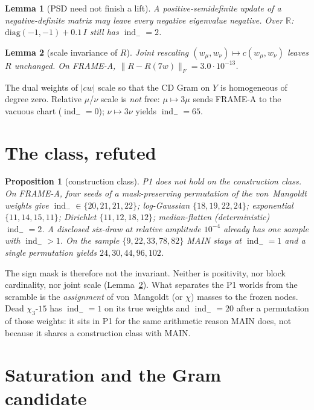 \documentclass[11pt]{article}
\newtheorem{lemma}{Lemma}
\newtheorem{prop}{Proposition}
\theoremstyle{remark}
\newcommand{\indm}{\operatorname{ind}_{-}}
\begin{document}
\begin{lemma}[PSD need not finish a lift]\label{lem:psd}
A positive-semidefinite update of a negative-definite matrix
may leave every negative eigenvalue negative.
Over $\mathbb{R}$: $\mathrm{diag}(-1,-1)+0.1\,I$ still has
$\indm=2$.
\end{lemma}

\begin{lemma}[scale invariance of $R$]\label{lem:scale}
Joint rescaling $(w_\mu,w_\nu)\mapsto c(w_\mu,w_\nu)$ leaves
$R$ unchanged.
On FRAME-A, $\|R-R(7w)\|_F=3.0\cdot 10^{-13}$.
\end{lemma}

The dual weights of $|cw|$ scale so that the CD Gram on $Y$
is homogeneous of degree zero.
Relative $\mu$/$\nu$ scale is \emph{not} free:
$\mu\mapsto 3\mu$ sends FRAME-A to the vacuous chart
($\indm=0$); $\nu\mapsto 3\nu$ yields $\indm=65$.

\section{The class, refuted}\label{sec:class}

\begin{prop}[construction class]\label{prop:class}
P1 does not hold on the construction class.
On FRAME-A, four seeds of a mask-preserving permutation of
the von~Mangoldt weights give $\indm\in\{20,21,21,22\}$;
log-Gaussian $\{18,19,22,24\}$; exponential $\{11,14,15,11\}$;
Dirichlet $\{11,12,18,12\}$; median-flatten (deterministic)
$\indm=2$.
A disclosed six-draw at relative amplitude $10^{-4}$ already
has one sample with $\indm>1$.
On the sample $\{9,22,33,78,82\}$ MAIN stays at $\indm=1$
and a single permutation yields
$24,30,44,96,102$.
\end{prop}

The sign mask is therefore not the invariant.
Neither is positivity, nor block cardinality, nor joint
scale (Lemma~\ref{lem:scale}).
What separates the P1 worlds from the scramble is the
\emph{assignment} of von~Mangoldt (or $\chi$) masses to the
frozen nodes.
Dead $\chi_3$-$15$ has $\indm=1$ on its true weights and
$\indm=20$ after a permutation of those weights: it sits in
P1 for the same arithmetic reason MAIN does, not because it
shares a construction class with MAIN.

\section{Saturation and the Gram candidate}\label{sec:sat}
\end{document}
